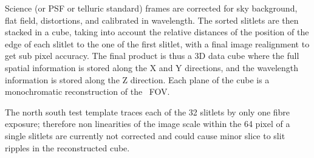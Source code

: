 Science (or PSF or telluric standard) frames are corrected for sky background, 
flat field, distortions, and calibrated in wavelength. 
The sorted slitlets are then stacked in a cube, taking into account the 
relative distances of the position of the edge of each slitlet to 
the one of the first slitlet, 
with a final image realignment to get sub pixel accuracy.
The final product is thus a 3D data cube where the full spatial information 
is stored along the X and Y directions, and the wavelength information is 
stored along the Z direction. Each plane of the cube is a monochromatic 
reconstruction of the \instname\, FOV.

The north south test template traces each of the 32 slitlets by only one 
fibre exposure; therefore non linearities of the image scale within the 64 
pixel of a single slitlets are currently not corrected and could cause minor 
slice to slit ripples in the reconstructed cube.

